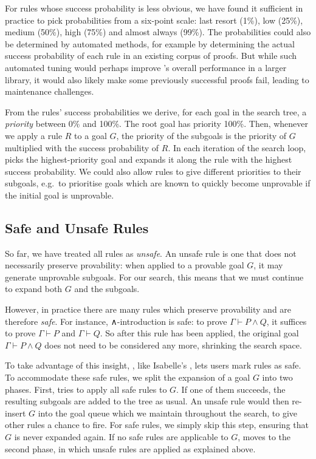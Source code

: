 For rules whose success probability is less obvious, we have found it sufficient in practice to pick probabilities from a six-point scale: last resort (1\%), low (25\%), medium (50\%), high (75\%) and almost always (99\%).
The probabilities could also be determined by automated methods, for example by determining the actual success probability of each rule in an existing corpus of proofs.
But while such automated tuning would perhaps improve \Aesop's overall performance in a larger library, it would also likely make some previously successful proofs fail, leading to maintenance challenges.

From the rules' success probabilities we derive, for each goal in the search tree, a \emph{priority} between 0\% and 100\%.
The root goal has priority 100\%.
Then, whenever we apply a rule $R$ to a goal $G$, the priority of the subgoals is the priority of $G$ multiplied with the success probability of $R$.
In each iteration of the search loop, \Aesop{} picks the highest-priority goal and expands it along the rule with the highest success probability.
We could also allow rules to give different priorities to their subgoals, e.g.\ to prioritise goals which are known to quickly become unprovable if the initial goal is unprovable.

\subsection{Safe and Unsafe Rules}%
\label{sec:safe}

So far, we have treated all rules as \emph{unsafe}.
An unsafe rule is one that does not necessarily preserve provability: when applied to a provable goal $G$, it may generate unprovable subgoals.
For our search, this means that we must continue to expand both $G$ and the subgoals.

However, in practice there are many rules which preserve provability and are therefore \emph{safe}.
For instance, ∧-introduction is safe: to prove $Γ ⊢ P ∧ Q$, it suffices to prove $Γ ⊢ P$ and $Γ ⊢ Q$.
So after this rule has been applied, the original goal $Γ ⊢ P ∧ Q$ does not need to be considered any more, shrinking the search space.

To take advantage of this insight, \Aesop{}, like Isabelle's \auto, lets users mark rules as safe.
To accommodate these safe rules, we split the expansion of a goal $G$ into two phases.
First, \Aesop{} tries to apply all safe rules to $G$.
If one of them succeeds, the resulting subgoals are added to the tree as usual.
An unsafe rule would then re-insert $G$ into the goal queue which we maintain throughout the search, to give other rules a chance to fire.
For safe rules, we simply skip this step, ensuring that $G$ is never expanded again.
If no safe rules are applicable to $G$, \Aesop{} moves to the second phase, in which unsafe rules are applied as explained above.

